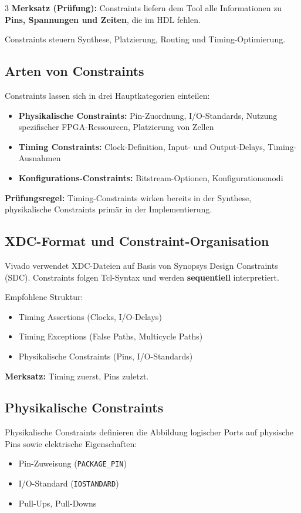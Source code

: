\documentclass[10pt,a4paper]{article}
\newcommand{\hilite}[1]{\colorbox{yellow!25}{#1}}
\newcommand{\imp}[1]{\textbf{\textcolor{codeemph}{#1}}}
\begin{document}
\begin{multicols}{3}
\imp{Merksatz (Prüfung):}  
\hilite{Constraints} liefern dem Tool alle Informationen zu \textbf{Pins, \hilite{Spannungen} und \hilite{Zeiten}}, die im HDL fehlen.

Constraints steuern Synthese, Platzierung, Routing und Timing-Optimierung.

\subsection{Arten von Constraints}
Constraints lassen sich in drei Hauptkategorien einteilen:
\begin{itemize}
  \item \textbf{Physikalische Constraints:} Pin-Zuordnung, I/O-Standards, Nutzung spezifischer FPGA-Ressourcen, Platzierung von Zellen
  \item \textbf{Timing Constraints:} Clock-Definition, Input- und Output-Delays, Timing-Ausnahmen
  \item \textbf{Konfigurations-Constraints:} Bitstream-Optionen, Konfigurationsmodi
\end{itemize}

\imp{Prüfungsregel:}  
\hilite{Timing}-\hilite{Constraints} \hilite{wirken} bereits in der Synthese, physikalische Constraints primär in der Implementierung.

\subsection{XDC-Format und Constraint-Organisation}
Vivado verwendet XDC-Dateien auf Basis von Synopsys Design Constraints (SDC).  
Constraints folgen Tcl-Syntax und werden \textbf{sequentiell} interpretiert.

Empfohlene Struktur:
\begin{itemize}
  \item Timing Assertions (Clocks, I/O-Delays)
  \item Timing Exceptions (False Paths, Multicycle Paths)
  \item Physikalische Constraints (Pins, I/O-Standards)
\end{itemize}

\textbf{Merksatz:}  
\hilite{Timing zuerst, Pins zuletzt.}

\subsection{Physikalische Constraints}
Physikalische Constraints definieren die Abbildung logischer Ports auf physische Pins sowie elektrische Eigenschaften:
\begin{itemize}
  \item Pin-Zuweisung (\texttt{PACKAGE\_PIN})
  \item I/O-Standard (\texttt{IOSTANDARD})
  \item Pull-Ups, Pull-Downs
\end{itemize}


\end{multicols}
\end{document}
